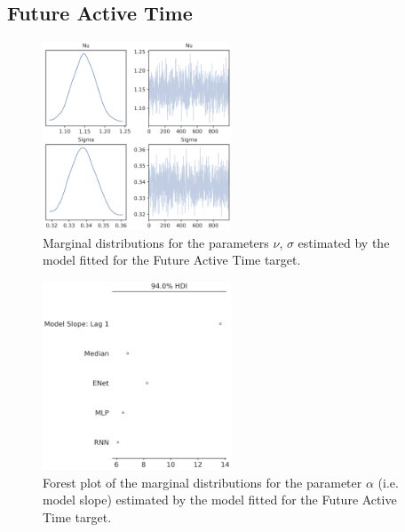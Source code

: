 \subsection{Future Active Time}
\label{future_act_bayes_2}

\begin{figure}[ht]
\centering
\includegraphics[width=0.5\textwidth]{images/appendix_C/Future Active Time_marginals_2.png}
\caption[\textbf{Future active time marginal distributions}]{Marginal distributions for the parameters $\nu$, $\sigma$ estimated by the model fitted for the Future Active Time target.}
\label{marginals_act_2}
\end{figure}
\FloatBarrier

\begin{figure}[ht]
\centering
\includegraphics[width=0.5\textwidth]{images/appendix_C/Future Active Time_models_2.png}
\caption[\textbf{Future active time model fixed effect}]{Forest plot of the marginal distributions for the parameter $\alpha$ (i.e. model slope) estimated by the model fitted for the Future Active Time target.}
\label{model_act_2}
\end{figure}
\FloatBarrier

